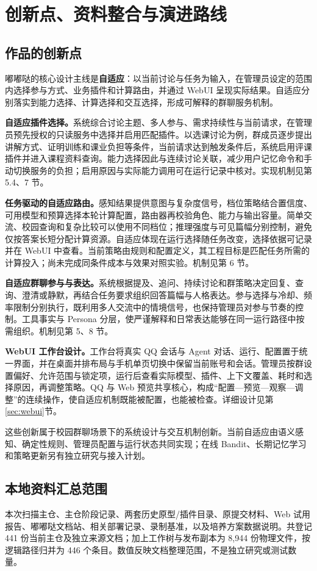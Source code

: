 \section{创新点、资料整合与演进路线}
\label{sec:synthesis}
\subsection{作品的创新点}
嘟嘟哒的核心设计主线是\textbf{自适应}：以当前讨论与任务为输入，在管理员设定的范围内选择参与方式、业务插件和计算路由，并通过 WebUI 呈现实际结果。自适应分别落实到能力选择、计算选择和交互选择，形成可解释的群聊服务机制。

\textbf{自适应插件选择。}系统综合讨论主题、多人参与、需求持续性与当前请求，在管理员预先授权的只读服务中选择并启用匹配插件。以选课讨论为例，群成员逐步提出讲解方式、证明训练和课业负担等条件，当前请求达到触发条件后，系统启用评课插件并进入课程资料查询。能力选择因此与连续讨论关联，减少用户记忆命令和手动切换服务的负担；启用原因与实际能力调用可在运行记录中核对。实现机制见第 5.4、7 节。

\textbf{任务驱动的自适应路由。}感知结果提供意图与复杂度信号，档位策略结合置信度、可用模型和预算选择本轮计算配置，路由器再校验角色、能力与输出容量。简单交流、校园查询和复杂比较可以使用不同档位；推理强度与可见篇幅分别控制，避免仅按答案长短分配计算资源。自适应体现在运行选择随任务改变，选择依据可记录并在 WebUI 中查看。当前策略由规则和配置定义，其工程目标是匹配任务所需的计算投入；尚未完成同条件成本与效果对照实验。机制见第 6 节。

\textbf{自适应群聊参与与表达。}系统根据提及、追问、持续讨论和群策略决定回复、查询、澄清或静默，再结合任务要求组织回答篇幅与人格表达。参与选择与冷却、频率限制分别执行，既利用多人交流中的情境信号，也保持管理员对参与节奏的控制。工具事实与 Persona 分层，使严谨解释和日常表达能够在同一运行路径中按需组织。机制见第 5、8 节。

\textbf{WebUI 工作台设计。}工作台将真实 QQ 会话与 Agent 对话、运行、配置置于统一界面，并在桌面并排布局与手机单页切换中保留当前账号和会话。管理员按群设置偏好、允许范围与锁定项，运行后查看实际模型、插件、上下文覆盖、耗时和选择原因，再调整策略。QQ 与 Web 预览共享核心，构成“配置—预览—观察—调整”的连续操作，使自适应机制既能被配置，也能被检查。详细设计见第\ref{sec:webui}节。

这些创新属于校园群聊场景下的系统设计与交互机制创新。当前自适应由语义感知、确定性规则、管理员配置与运行状态共同实现；在线 Bandit、长期记忆学习和策略更新另有独立研究与接入计划。

\subsection{本地资料汇总范围}
本次扫描主仓、主仓阶段记录、两套历史原型/插件目录、原提交材料、Web 试用报告、嘟嘟哒文档站、相关部署记录、录制基准，以及培养方案数据说明。共登记 441 份当前主仓及独立来源文档；加上工作树与发布副本为 8,944 份物理文件，按逻辑路径归并为 446 个条目。数值反映文档整理范围，不是独立研究或测试数量。

